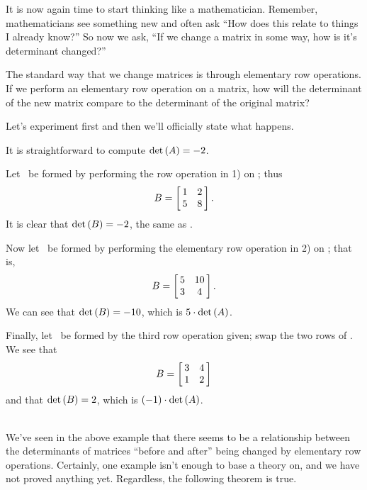 It is now again time to start thinking like a mathematician. Remember, mathematicians see something new and often ask ``How does this relate to things I already know?'' So now we ask, ``If we change a matrix in some way, how is it's determinant changed?''

The standard way that we change matrices is through elementary row operations. If we perform an elementary row operation on a matrix, how will the determinant of the new matrix compare to the determinant of the original matrix?

Let's experiment first and then we'll officially state what happens. \\

{%
It is straightforward to compute $\det{\tta} = -2$.

Let \ttb\ be formed by performing the row operation in 1) on \tta; thus $$\ttb = \bmx{cc} 1&2\\5&8\emx.$$  It is clear that $\det{\ttb} = -2$, the same as \det{\tta}.

Now let \ttb\ be formed by performing the elementary row operation in 2) on \tta; that is, $$\ttb = \bmx{cc}5&10\\3&4\emx.$$ We can see that $\det{\ttb} = -10$, which is $5\cdot\det{\tta}$.

Finally, let \ttb\ be formed by the third row operation given; swap the two rows of \tta. We see that $$\ttb = \bmx{cc}3&4\\1&2\emx$$ and that $\det{\ttb} = 2$, which is $(-1)\cdot\det{\tta}$.} \\ %

We've seen in the above example that there seems to be a relationship between the determinants of matrices ``before and after'' being changed by elementary row operations. Certainly, one example isn't enough to base a theory on, and we have not proved anything yet. Regardless, the following theorem is true.

